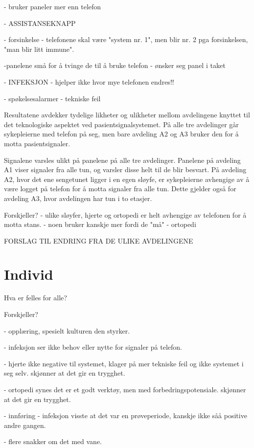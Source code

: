 - bruker paneler mer enn telefon 

- ASSISTANSEKNAPP

- forsinkelse - telefonene skal være "system nr. 1", men blir nr. 2 pga forsinkelsen, "man blir litt immune".

-panelene små for å tvinge de til å bruke telefon
	- ønsker seg panel i taket




	- INFEKSJON - hjelper ikke hvor mye telefonen endres!!


- spøkelsesalarmer - tekniske feil

Resultatene avdekker tydelige likheter og ulikheter mellom avdelingene knyttet til det teknologiske aspektet ved pasientsignalsystemet. På alle tre avdelinger går sykepleierne med telefon på seg, men bare avdeling A2 og A3 bruker den for å motta pasientsignaler. 


Signalene varsles ulikt på panelene på alle tre avdelinger. Panelene på avdeling A1 viser signaler fra alle tun, og varsler disse helt til de blir besvart. På avdeling A2, hvor det ene sengetunet ligger i en egen sløyfe, er sykepleierne avhengige av å være logget på telefon for å motta signaler fra alle tun. Dette gjelder også for avdeling A3, hvor avdelingen har tun i to etasjer.

Forskjeller?
- ulike sløyfer, hjerte og ortopedi er helt avhengige av telefonen for å motta stans.	
	- noen bruker kanskje mer fordi de "må" - ortopedi
	
	
FORSLAG TIL ENDRING FRA DE ULIKE AVDELINGENE	

\section{Individ}
Hva er felles for alle?

Forskjeller?

- opplæring, spesielt kulturen den styrker.

- infeksjon ser ikke behov eller nytte for signaler på telefon.

- hjerte ikke negative til systemet, klager på mer tekniske feil og ikke systemet i seg selv. skjønner at det gir en trygghet.

- ortopedi synes det er et godt verktøy, men med forbedringspotensiale. skjønner at det gir en trygghet.

- innføring - infeksjon visste at det var en prøveperiode, kanskje ikke såå positive andre gangen.

- flere snakker om det med vane.

